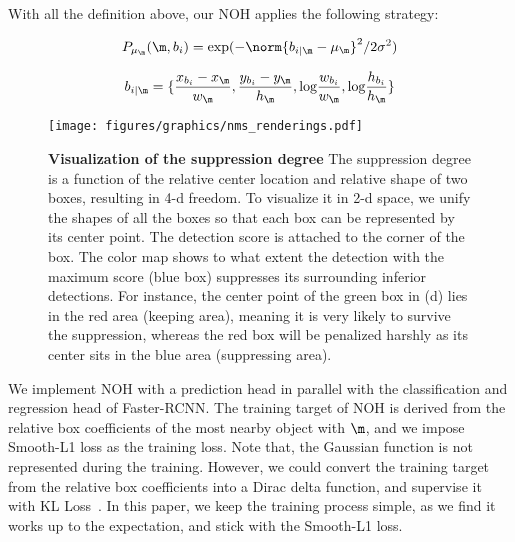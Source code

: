 \documentclass[sigconf]{acmart}
\begin{document}
With all the definition above, our NOH applies the following strategy:

\begin{equation}
    P_{\mu_\m}(\m, b_i) =
    \text{exp}(-\norm{b_{i|\m} - \mu_\m}^2 / 2\sigma^2)
    \label{eq:our-nms-g-1}
\end{equation}

\begin{equation}
    b_{i|\m} = \{
        \frac{x_{b_i}-x_\m}{w_\m},
        \frac{y_{b_i}-y_\m}{h_\m},
        \text{log}\frac{w_{b_i}}{w_\m},
        \text{log}\frac{h_{b_i}}{h_\m}
    \}
    \label{eq:our-nms-g-2}
\end{equation}
 \begin{figure}[t]
\begin{center}
\texttt{[image: figures/graphics/nms\_renderings.pdf]}
\end{center}
\caption{\textbf{Visualization of the suppression degree} {\normalfont The suppression degree is a function of the relative center location and relative shape of two boxes, resulting in 4-d freedom. To visualize it in 2-d space, we unify the shapes of all the boxes so that each box can be represented by its center point. The detection score is attached to the corner of the box. The color map shows to what extent the detection with the maximum score (blue box) suppresses its surrounding inferior detections. For instance, the center point of the green box in (d) lies in the red area (keeping area), meaning it is very likely to survive the suppression, whereas the red box will be penalized harshly as its center sits in the blue area (suppressing area).}}
\vspace{-0.3cm}
\label{fig:nms}
\end{figure}

 
We implement NOH with a prediction head in parallel with the classification and regression head of Faster-RCNN. The training target of NOH is derived from the relative box coefficients of the most nearby object with $\m$, and we impose Smooth-L1 loss as the training loss. Note that, the Gaussian function is not represented during the training. However, we could convert the training target from the relative box coefficients into a Dirac delta function, and supervise it with KL Loss~\cite{kl-loss}. In this paper, we keep the training process simple, as we find it works up to the expectation, and stick with the Smooth-L1 loss.
\end{document}
